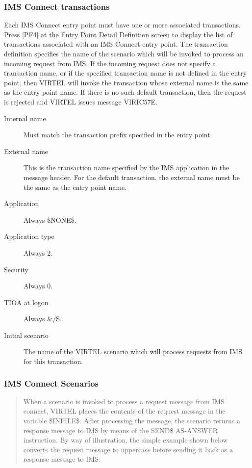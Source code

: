 \documentclass[letterpaper,10pt,english]{sphinxmanual}
\begin{document}
\subsubsection{IMS Connect transactions}
\label{\detokenize{connectivity_guide:ims-connect-transactions}}
Each IMS Connect entry point must have one or more associated transactions. Press {[}PF4{]} at the Entry Point Detail Definition screen to display the list of transactions associated with an IMS Connect entry point. The transaction definition specifies the name of the scenario which will be invoked to process an incoming request from IMS. If the incoming request does not specify a transaction name, or if the specified transaction name is not defined in the entry point, then VIRTEL will invoke the transaction whose external name is the same as the entry point name. If there is no such default transaction, then the request is rejected and VIRTEL issues message VIRIC57E.

\begin{description}
\item[{Internal name}] \leavevmode
Must match the transaction prefix specified in the entry point.

\item[{External name}] \leavevmode
This is the transaction name specified by the IMS application in the
message header. For the default transaction, the external name must
be the same as the entry point name.

\item[{Application}] \leavevmode
Always \$NONE\$.

\item[{Application type}] \leavevmode
Always 2.

\item[{Security}] \leavevmode
Always 0.

\item[{TIOA at logon}] \leavevmode
Always \&/S.

\item[{Initial scenario}] \leavevmode
The name of the VIRTEL scenario which will process requests from IMS
for this transaction.

\end{description}


\subsubsection{IMS Connect Scenarios}
\label{\detokenize{connectivity_guide:ims-connect-scenarios}}\begin{quote}

When a scenario is invoked to process a request message from IMS connect, VIRTEL places the contents of the request message in the variable \$INFILE\$. After processing the message, the scenario  returns a response message to IMS by means of the SEND\$ AS-ANSWER instruction. By way of illustration, the simple example shown below converts the request message to uppercase before sending it back as a response message to IMS:
\end{quote}
\end{document}
